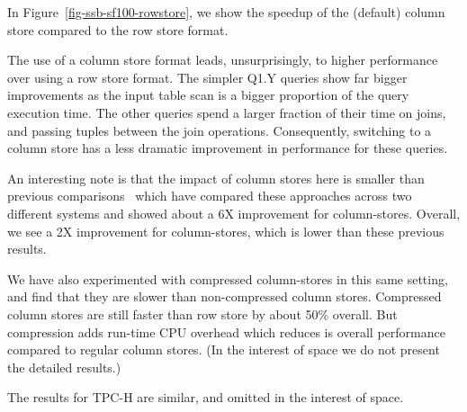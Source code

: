 In Figure~\ref{fig-ssb-sf100-rowstore}, we show the speedup of the (default) column store compared to the row store format.


The use of a column store format leads, unsurprisingly, to higher performance over using a row store format. %
The simpler Q1.Y queries show far bigger improvements as the input table scan is a bigger proportion of the query execution time. The other queries spend a larger fraction of their time on joins, and passing tuples between the join operations. Consequently, switching to a column store has a less dramatic improvement in performance for these queries.

An interesting note is that the impact of column stores here is  smaller than previous comparisons~\cite{AbadiMH08} which have compared these approaches across two different systems and showed about a 6X improvement for column-stores. Overall, we see a 2X improvement for column-stores, which is lower than these previous results.

We have also experimented with compressed column-stores in this same setting, and find that they are slower than non-compressed column stores. Compressed column stores are still faster than row store by about 50\% overall. But compression adds run-time CPU overhead which reduces is overall performance compared to regular column stores. (In the interest of space we do not present the detailed results.)

The results for TPC-H are similar, and omitted in the interest of space.



